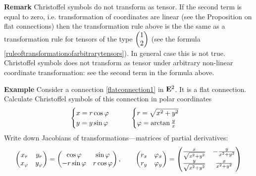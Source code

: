 \documentclass[12pt]{article}
\theoremstyle{theorem}
\numberwithin{equation}{section}
\begin{document}
{\bf Remark}  Christoffel symbols do not transform as tensor.
If the second term is equal to zero, i.e. transformation of coordinates are linear
(see the Proposition on flat connections)  then the transformation rule above is the the same as a
transformation rule for tensors of the type $\begin{pmatrix} 1\cr 2\cr\end{pmatrix}$
(see the formula \eqref{ruleoftransformationofarbitrarytensors}).
 In general case this is not true. Christoffel symbols does not transform as tensor
 under arbitrary non-linear coordinate transformation: see the second term in the formula above.


 \m

 \m



  {\bf Example} Consider a connection \eqref{flatconnection1} in ${\bf E}^2$. It is a flat connection.
            Calculate Christoffel symbols of this connection in polar coordinates
                       \begin{equation}\label{polarcoordinates}
                        \begin{cases}
                        x=r\cos\varphi\cr
                        y=y\sin\varphi\cr
                        \end{cases}
                        \qquad
                        \begin{cases}
                        r=\sqrt {x^2+y^2}\cr
                        \varphi={\rm arctan\,} {y\over x}\cr
                           \end{cases}
                                \end{equation}
Write down Jacobians of transformations---matrices of partial derivatives:
                      \begin{equation}\label{polarcoordinates2}
                      \begin{pmatrix}
                      x_r &y_r\cr
                      x_\varphi &y_\varphi\cr
                      \end{pmatrix}=
                      \begin{pmatrix}
                      \cos\varphi &\sin\varphi\cr
                      -r\sin\varphi & r\cos\varphi\cr
                      \end{pmatrix},\qquad
                      \begin{pmatrix}
                      r_x &\varphi_x\cr
                      r_y &\varphi_y\cr
                      \end{pmatrix}=
                      \begin{pmatrix}
                      {x\over \sqrt{x^2+y^2}} &-{y\over {x^2+y^2}}\cr
                      {y\over \sqrt{x^2+y^2}} & {x\over {x^2+y^2}}\cr
                      \end{pmatrix}
                      \end{equation}
\end{document}
